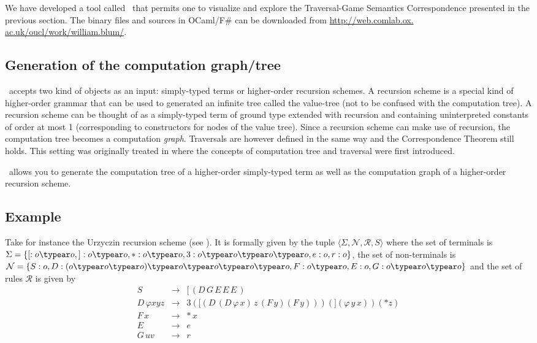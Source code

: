 We have developed a tool called \toolname\ that permits one to visualize and explore the Traversal-Game Semantics Correspondence presented in the previous section. The binary files and sources in OCaml/F\# can be downloaded from \url{http://web.comlab.ox. ac.uk/oucl/work/william.blum/}.

\subsection{Generation of the computation graph/tree}

\toolname\ accepts two kind of objects as an input: simply-typed terms or higher-order recursion schemes. A recursion scheme is a special kind of higher-order grammar that can be used to generated an infinite tree called the value-tree (not to be confused with the computation tree). A recursion scheme can be thought of as a simply-typed term of ground type extended with recursion and containing uninterpreted constants of order at most 1 (corresponding to constructors for nodes of the value tree). Since a recursion scheme can make use of recursion, the computation tree becomes a computation \emph{graph}. Traversals are however defined in the same way and the Correspondence Theorem still holds. This setting was originally treated in \cite{OngLics2006} where the concepts of computation tree and traversal were first introduced.


\toolname\ allows you to generate the computation tree of a higher-order simply-typed term as well as the computation graph of a higher-order recursion scheme.

\subsection{Example}

Take for instance the Urzyczin recursion scheme (see \cite{demirandathesis}). It is formally given by the tuple $\langle \Sigma, \mathcal{N}, \mathcal{R}, S \rangle $ where the set of terminals is $\Sigma = \{[:o\typear o,
    ]:o \typear o,*:o \typear o, 3:o \typear o \typear o \typear o, e:o,
    r:o\}$, the set of non-terminals is
 $\mathcal{N} = \{ S:o,
    D:(o \typear o \typear o) \typear o \typear o \typear o \typear
    o,
    F:o \typear o,
    E:o,
    G:o \typear o \typear o \}$ and the set of rules $\mathcal{R}$ is given by
\[\begin{array}{rll}
   S\, & \rightarrow & [\, (D\, G\, E\, E\, E\,) \\
    D\, \varphi x y z & \rightarrow & 3 ([ (D\, (D\, \varphi\, x)\, z\, (F\, y) (F\, y))) (] (\varphi\, y\, x)) (* z) \\
    F\, x & \rightarrow & *\, x \\
    E\, & \rightarrow & e \\
    G\, u v & \rightarrow & r
\end{array}\]


